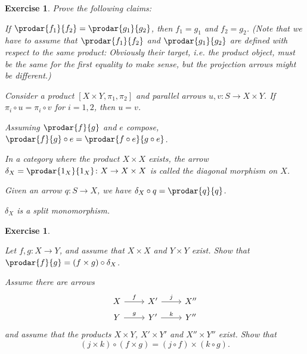 \documentclass[article, a4paper, 11pt, oneside]{memoir}
\numberwithin{equation}{chapter}
\theoremstyle{myexample}
\newtheorem{exercise}[theorem]{Exercise}
\theoremstyle{myexamplebreak}
\newtheorem{exercisebreak}[theorem]{Exercise}
\begin{document}
\begin{exercise}
    Prove the following claims:
    \begin{enumexercise}
        \item If $\prodar{f_1}{f_2} = \prodar{g_1}{g_2}$, then $f_1 = g_1$ and $f_2 = g_2$. (Note that we have to assume that $\prodar{f_1}{f_2}$ and $\prodar{g_1}{g_2}$ are defined with respect to the same product: Obviously their target, i.e. the product \emph{object}, must be the same for the first equality to make sense, but the \emph{projection arrows} might be different.)
        
        \item Consider a product $[X \times Y, \pi_1, \pi_2]$ and parallel arrows $u,v \colon S \to X \times Y$. If $\pi_i \circ u = \pi_i \circ v$ for $i = 1,2$, then $u = v$.
        
        \item Assuming $\prodar{f}{g}$ and $e$ compose, $\prodar{f}{g} \circ e = \prodar{f \circ e}{g \circ e}$.
    \end{enumexercise}
    In a category where the product $X \times X$ exists, the arrow $\delta_X = \prodar{1_X}{1_X} \colon X \to X \times X$ is called the \emph{diagonal morphism} on $X$.
    \begin{enumexercise}[resume*]
        \item Given an arrow $q \colon S \to X$, we have $\delta_X \circ q = \prodar{q}{q}$.

        \item $\delta_X$ is a split monomorphism.
    \end{enumexercise}
\end{exercise}


\begin{exercisebreak}
    \begin{enumexercise}
        \item Let $f,g \colon X \to Y$, and assume that $X \times X$ and $Y \times Y$ exist. Show that $\prodar{f}{g} = (f \times g) \circ \delta_X$.
        
        \item Assume there are arrows
        \begin{equation*}
            \begin{tikzcd}[row sep=tiny]
                X
                    \ar[r, "f"]
                & X'
                    \ar[r, "j"]
                & X''
                \\
                Y
                    \ar[r, "g"]
                & Y'
                    \ar[r, "k"]
                & Y''
            \end{tikzcd}
        \end{equation*}
        and assume that the products $X \times Y$, $X' \times Y'$ and $X'' \times Y''$ exist. Show that
        \begin{equation*}
            (j \times k) \circ (f \times g)
                = (j \circ f) \times (k \circ g).
        \end{equation*}
    \end{enumexercise}
\end{exercisebreak}
\end{document}
